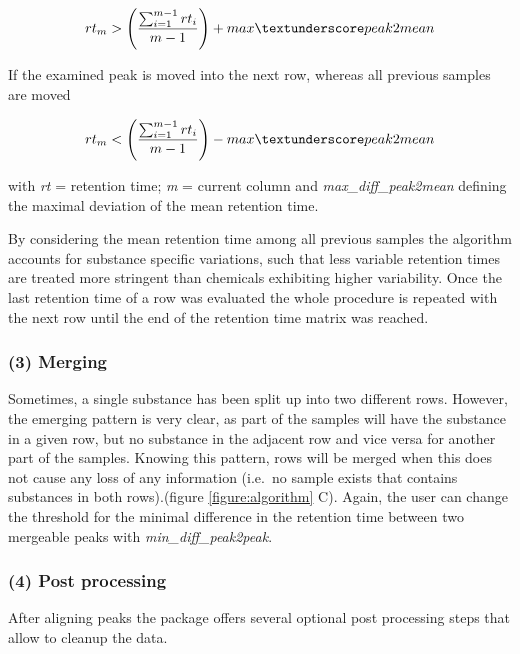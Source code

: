 \begin{equation}
rt_{m} > \left(\frac{\sum_{i=1}^{m-1}rt_{i}}{m-1}\right) + max\textunderscore peak2mean
\end{equation}

If the examined peak is moved into the next row, whereas all previous
samples are moved \par

\begin{equation}
rt_{m} < \left(\frac{\sum_{i=1}^{m-1}rt_{i}}{m-1}\right) - max\textunderscore peak2mean
\end{equation}

with \emph{rt} = retention time; \emph{m} = current column and
\emph{max\_diff\_peak2mean} defining the maximal deviation of the mean
retention time.

By considering the mean retention time among all previous samples the
algorithm accounts for substance specific variations, such that less
variable retention times are treated more stringent than chemicals
exhibiting higher variability. Once the last retention time of a row was
evaluated the whole procedure is repeated with the next row until the
end of the retention time matrix was reached.

\subsubsection{(3) Merging}\label{merging}

Sometimes, a single substance has been split up into two different rows.
However, the emerging pattern is very clear, as part of the samples will
have the substance in a given row, but no substance in the adjacent row
and vice versa for another part of the samples. Knowing this pattern,
rows will be merged when this does not cause any loss of any information
(i.e.~no sample exists that contains substances in both rows).(figure
\ref{figure:algorithm} C). Again, the user can change the threshold for
the minimal difference in the retention time between two mergeable peaks
with \emph{min\_diff\_peak2peak}. \par 

\subsubsection{(4) Post processing}\label{post-processing}

After aligning peaks the package offers several optional post processing
steps that allow to cleanup the data.

